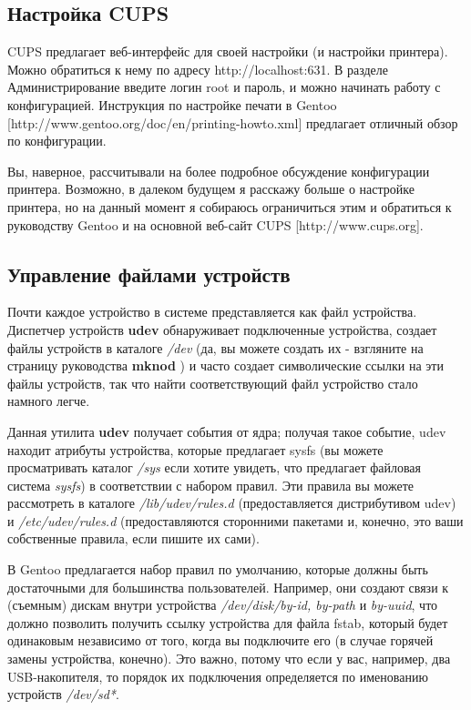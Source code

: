 \documentclass[10pt]{book}
\begin{document}
\subsection{Настройка CUPS}

CUPS предлагает веб-интерфейс для своей настройки (и настройки принтера). Можно обратиться к нему по адресу http://localhost:631. В разделе Администрирование введите логин root и пароль, и можно начинать работу с конфигурацией. Инструкция по настройке печати в Gentoo [http://www.gentoo.org/doc/en/printing-howto.xml] предлагает отличный обзор по конфигурации.

Вы, наверное, рассчитывали на более подробное обсуждение конфигурации принтера. Возможно, в далеком будущем я расскажу больше о настройке принтера, но на данный момент я собираюсь ограничиться этим и обратиться к руководству Gentoo и на основной веб-сайт CUPS [http://www.cups.org].

\subsection{Управление файлами устройств}

Почти каждое устройство в системе представляется как файл устройства. Диспетчер устройств  \textbf{udev} обнаруживает подключенные устройства, создает файлы устройств в каталоге \textit{/dev} (да, вы можете создать их - взгляните на страницу руководства \textbf{mknod} ) и часто создает символические ссылки на эти файлы устройств, так что найти соответствующий файл устройство стало намного легче.

Данная утилита \textbf{udev} получает события от ядра; получая такое событие, udev находит атрибуты устройства, которые предлагает sysfs (вы можете просматривать каталог \textit{/sys} если хотите увидеть, что предлагает файловая система \textit{sysfs}) в соответствии с набором правил. Эти правила вы можете рассмотреть в каталоге \textit{/lib/udev/rules.d} (предоставляется  дистрибутивом udev) и \textit{/etc/udev/rules.d} (предоставляются сторонними пакетами и, конечно, это ваши собственные правила, если пишите их сами).

В Gentoo предлагается набор правил по умолчанию, которые должны быть достаточными для большинства пользователей. Например, они создают связи к (съемным) дискам внутри устройства \textit{/dev/disk/by-id, by-path} и \textit{ by-uuid}, что должно позволить получить ссылку устройства для файла fstab, который будет одинаковым независимо от того, когда вы подключите его (в случае горячей замены устройства, конечно). Это важно, потому что если у вас, например, два USB-накопителя, то порядок их подключения определяется по именованию устройств \textit{/dev/sd*}.
\end{document}
